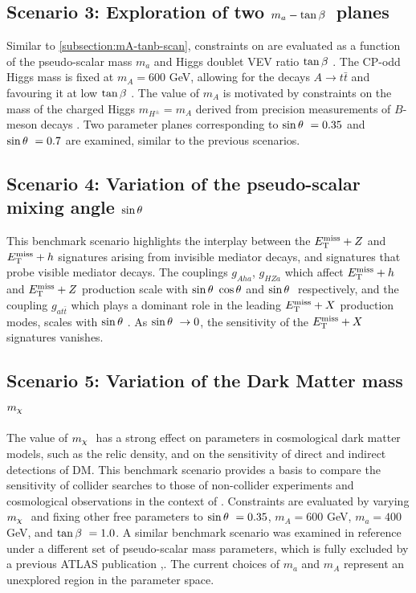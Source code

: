 \subsection{Scenario 3: Exploration of two \texorpdfstring{$m_a-\tan\beta~$}{TEXT} planes }\label{subsection:ma-tanb-scan}

Similar to \ref{subsection:mA-tanb-scan}, constraints on \thdma are evaluated as a function of the pseudo-scalar mass $m_a$ and Higgs doublet VEV ratio $\tan\beta~$. The CP-odd Higgs mass is fixed at $m_A=600$ GeV, allowing for the decays $A\rightarrow t\bar{t}$ and favouring it at low $\tan\beta~$. The value of $m_A$ is motivated by constraints on the mass of the charged Higgs $m_{H^{\pm}} = m_A$ derived from precision measurements of $B$-meson decays \cite{Misiak:2017bgg,Bauer:2017ota}. Two parameter planes corresponding to $\sin\theta~=0.35$ and $\sin\theta~=0.7$ are examined, similar to the previous scenarios.

\subsection{Scenario 4: Variation of the pseudo-scalar mixing angle \texorpdfstring{$\sin\theta~$}{TEXT} }
\label{subsection:sint-scan}
This benchmark scenario highlights the interplay between the $E_{\mathrm{T}}^{\mathrm{miss}}+Z$ and $E_{\mathrm{T}}^{\mathrm{miss}}+h$ signatures arising from invisible mediator decays, and signatures that probe visible mediator decays. The couplings $g_{Aha}$, $g_{HZa}$ which affect $E_{\mathrm{T}}^{\mathrm{miss}}+h$ and $E_{\mathrm{T}}^{\mathrm{miss}}+Z$ production scale with $\sin\theta~\cos\theta$ and $\sin\theta~$ respectively, and the coupling $g_{at\bar{t}}$ which plays a dominant role in the leading $E_{\mathrm{T}}^{\mathrm{miss}}+X$ production modes, scales with $\sin\theta~$. As $\sin\theta~\rightarrow 0$, the sensitivity of the $E_{\mathrm{T}}^{\mathrm{miss}}+X$ signatures vanishes. 

\subsection{Scenario 5: Variation of the Dark Matter mass \texorpdfstring{$m_{\chi}~$}{TEXT} }
\label{subsection:mchi-scan}
The value of $m_{\chi}~$ has a strong effect on parameters in cosmological dark matter models, such as the relic density, and on the sensitivity of direct and indirect detections of DM. This benchmark scenario provides a basis to compare the sensitivity of collider searches to those of non-collider experiments and cosmological observations in the context of \hdma. Constraints are evaluated by varying $m_{\chi}~$ and fixing other free parameters to $\sin\theta~=0.35$, $m_A=600$ GeV, $m_a=400$ GeV, and $\tan\beta~=1.0$. A similar benchmark scenario was examined in reference \cite{2HDMWGproxi} under a different set of pseudo-scalar mass parameters, which is fully excluded by a previous ATLAS publication \cite{EXOT-2017-32},. The current choices of $m_a$ and $m_A$ represent an unexplored region in the parameter space. 

